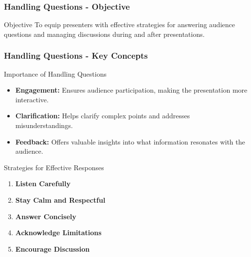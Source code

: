 \documentclass[aspectratio=169]{beamer}
\begin{document}
\begin{frame}[fragile]
    \frametitle{Handling Questions - Objective}
    \begin{block}{Objective}
        To equip presenters with effective strategies for answering audience questions and managing discussions during and after presentations.
    \end{block}
\end{frame}

\begin{frame}[fragile]
    \frametitle{Handling Questions - Key Concepts}
    \begin{block}{Importance of Handling Questions}
        \begin{itemize}
            \item \textbf{Engagement:} Ensures audience participation, making the presentation more interactive.
            \item \textbf{Clarification:} Helps clarify complex points and addresses misunderstandings.
            \item \textbf{Feedback:} Offers valuable insights into what information resonates with the audience.
        \end{itemize}
    \end{block}

    \begin{block}{Strategies for Effective Responses}
        \begin{enumerate}
            \item \textbf{Listen Carefully}
            \item \textbf{Stay Calm and Respectful}
            \item \textbf{Answer Concisely}
            \item \textbf{Acknowledge Limitations}
            \item \textbf{Encourage Discussion}
        \end{enumerate}
    \end{block}
\end{frame}
\end{document}

